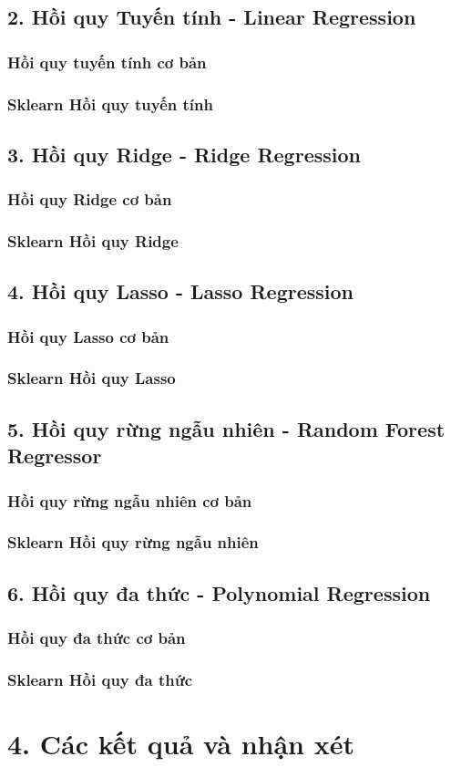 \documentclass{article}
\begin{document}
	\subsection{2. Hồi quy Tuyến tính - Linear Regression}
	\subsubsection{Hồi quy tuyến tính cơ bản}
	\subsubsection{Sklearn Hồi quy tuyến tính}
	
	\subsection{3. Hồi quy Ridge - Ridge Regression}
	\subsubsection{Hồi quy Ridge cơ bản}
	\subsubsection{Sklearn Hồi quy Ridge}
	\subsection{4. Hồi quy Lasso - Lasso Regression}
	\subsubsection{Hồi quy Lasso cơ bản}
	\subsubsection{Sklearn Hồi quy Lasso}
	\subsection{5. Hồi quy rừng ngẫu nhiên - Random Forest Regressor}
	\subsubsection{Hồi quy rừng ngẫu nhiên cơ bản}
	\subsubsection{Sklearn Hồi quy rừng ngẫu nhiên}
	\subsection{6. Hồi quy đa thức - Polynomial Regression}
	\subsubsection{Hồi quy đa thức cơ bản}
	\subsubsection{Sklearn Hồi quy đa thức}
	\section{4. Các kết quả và nhận xét}
	
	\nocite{*}
	\newpage\cleardoublepage
	
	
\end{document}
